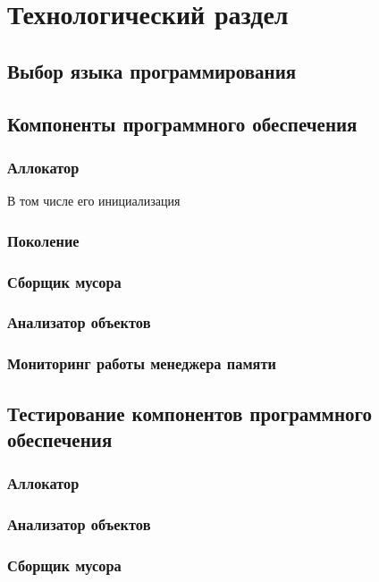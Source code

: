 \chapter{Технологический раздел}



\section{Выбор языка программирования}



\section{Компоненты программного обеспечения}

\subsection{Аллокатор}

В том числе его инициализация

\subsection{Поколение}

\subsection{Сборщик мусора}

\subsection{Анализатор объектов}

\subsection{Мониторинг работы менеджера памяти}



\section{Тестирование компонентов программного обеспечения}

\subsection{Аллокатор}

\subsection{Анализатор объектов}

\subsection{Сборщик мусора}